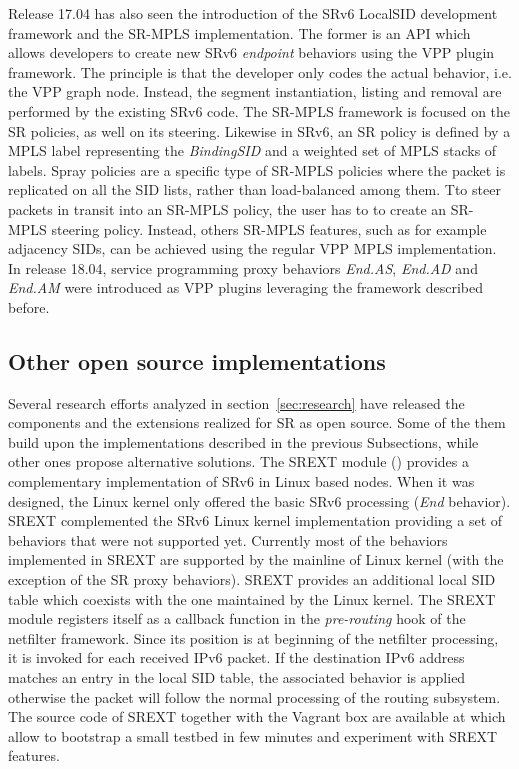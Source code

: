 Release 17.04 has also seen the introduction of the SRv6 LocalSID development framework and the SR-MPLS implementation. The former is an API which allows developers to create new SRv6 \textit{endpoint} behaviors using the VPP plugin framework. The principle is that the developer only codes the actual behavior, i.e. the VPP graph node. Instead, the segment instantiation, listing and removal are performed by the existing SRv6 code. The SR-MPLS framework is focused on the SR policies, as well on its steering. Likewise in SRv6, an SR policy is defined by a MPLS label representing the \textit{BindingSID} and a weighted set of MPLS stacks of labels. Spray policies are a specific type of SR-MPLS policies where the packet is replicated on all the SID lists, rather than load-balanced among them. Tto steer packets in transit into an SR-MPLS policy, the user has to to create an SR-MPLS steering policy. Instead, others SR-MPLS features, such as for example adjacency SIDs, can be achieved using the regular VPP MPLS implementation. In release 18.04, service programming proxy behaviors \textit{End.AS}, \textit{End.AD} and \textit{End.AM} were introduced as VPP plugins leveraging the framework described before.

\subsection{Other open source implementations}
\label{sec:rest}

Several research efforts analyzed in section~\ref{sec:research} have released the components and the extensions realized for SR as open source. Some of the them build upon the implementations described in the previous Subsections, while other ones propose alternative solutions. The SREXT module (\cite{17-vnf-chaining-sr}) provides a complementary implementation of SRv6 in Linux based nodes. When it was designed, the Linux kernel only offered the basic SRv6 processing (\textit{End} behavior). SREXT complemented the SRv6 Linux kernel implementation providing a set of behaviors that were not supported yet. Currently most of the behaviors implemented in SREXT are supported by the mainline of Linux kernel (with the exception of the SR proxy behaviors). SREXT provides an additional local SID table which coexists with the one maintained by the Linux kernel. The SREXT module registers itself as a callback function in the \textit{pre-routing} hook of the netfilter \cite{netfilter} framework. Since its position is at beginning of the netfilter processing, it is invoked for each received IPv6 packet. If the destination IPv6 address matches an entry in the local SID table, the associated behavior is applied otherwise the packet will follow the normal processing of the routing subsystem. The source code of SREXT together with the Vagrant box are available at \cite{srext-home} which allow to bootstrap a small testbed in few minutes and experiment with SREXT features.

